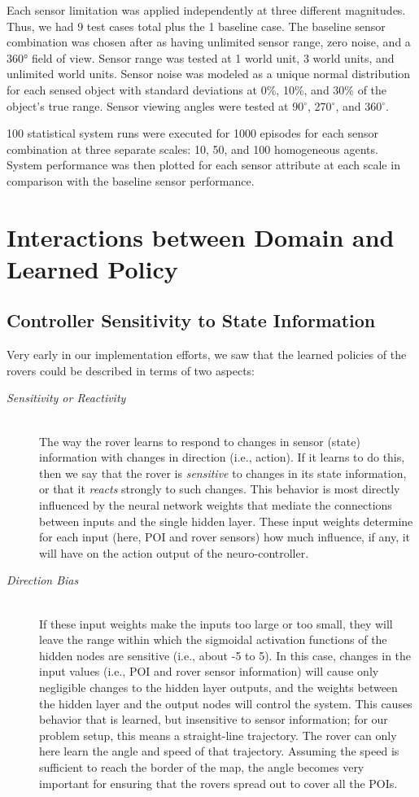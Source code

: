 \documentclass[letterpaper, 10 pt, conference]{ieeeconf}  %
\begin{document}
Each sensor limitation was applied independently at three different
magnitudes.  Thus, we had 9 test cases total plus the 1 baseline
case. The baseline sensor combination was chosen after \cite{agogino2008analyzing} as having
unlimited sensor range, zero noise, and a 360° field of view. Sensor
range was tested at 1 world unit, 3 world units, and unlimited world
units. Sensor noise was modeled as a unique normal distribution for
each sensed object with standard deviations at 0\%, 10\%, and 30\% of the
object’s true range. Sensor viewing angles were tested at 90$^{\circ}$, 270$^{\circ}$,
and 360$^{\circ}$.

100 statistical system runs were executed for 1000 episodes for each
sensor combination at three separate scales: 10, 50, and 100
homogeneous agents.  System performance was then plotted for each
sensor attribute at each scale in comparison with the baseline sensor
performance.


\section{Interactions between Domain and Learned Policy}
\subsection{Controller Sensitivity to State Information}
Very early in our implementation efforts, we saw that the learned policies of the rovers could be described in terms of two aspects:
\begin{description}
\item[\emph{Sensitivity or Reactivity}] \hfill \\
The way the rover learns to respond to changes in sensor (state) information with changes in direction (i.e., action). If it learns to do this, then we say that the rover is \emph{sensitive} to changes in its state information, or that it \emph{reacts} strongly to such changes. This behavior is most directly influenced by the neural network weights that mediate the connections between inputs and the single hidden layer. These input weights determine for each input (here, POI and rover sensors) how much influence, if any, it will have on the action output of the neuro-controller. 
\item[\emph{Direction Bias}] \hfill \\
If these input weights make the inputs too large or too small, they will leave the range within which the sigmoidal activation functions of the hidden nodes are sensitive (i.e., about -5 to 5). In this case, changes in the input values (i.e., POI and rover sensor information) will cause only negligible changes to the hidden layer outputs, and the weights between the hidden layer and the output nodes will control the system. This causes behavior that is learned, but insensitive to sensor information; for our problem setup, this means a straight-line trajectory. The rover can only here learn the angle and speed of that trajectory. Assuming the speed is sufficient to reach the border of the map, the angle becomes very important for ensuring that the rovers spread out to cover all the POIs. 
\end{description}
\end{document}
